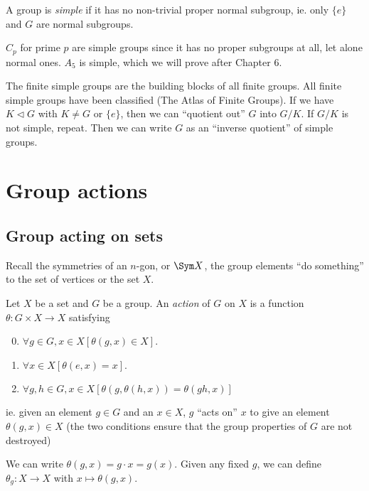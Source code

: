\documentclass[a4paper]{article}
\begin{document}
  \begin{defi}
    A group is \emph{simple} if it has no non-trivial proper normal subgroup, ie. only $\{e\}$ and $G$ are normal subgroups.
  \end{defi}

  \begin{eg}
    $C_p$ for prime $p$ are simple groups since it has no proper subgroups at all, let alone normal ones.
    $A_5$ is simple, which we will prove after Chapter 6.
  \end{eg}

  The finite simple groups are the building blocks of all finite groups. All finite simple groups have been classified (The Atlas of Finite Groups). If we have $K\lhd G$ with $K\not= G$ or $\{e\}$, then we can ``quotient out'' $G$ into $G/K$. If $G/K$ is not simple, repeat. Then we can write $G$ as an ``inverse quotient'' of simple groups.

  \section{Group actions}
  \subsection{Group acting on sets}
  Recall the symmetries of an $n$-gon, or $\Sym X$, the group elements ``do something'' to the set of vertices or the set $X$.

  \begin{defi}
    Let $X$ be a set and $G$ be a group. An \emph{action} of $G$ on $X$ is a function $\theta: G\times X\to X$ satisfying
    \begin{enumerate}[label=\arabic{*}.]
        \setcounter{enumi}{-1}
      \item $\forall g\in G, x\in X[\theta(g, x)\in X]$.
      \item $\forall x\in X[\theta(e, x) = x]$.
      \item $\forall g, h\in G, x\in X[\theta(g, \theta (h, x)) = \theta(gh, x)]$
    \end{enumerate}
    ie. given an element $g\in G$ and an $x\in X$, $g$ ``acts on'' $x$ to give an element $\theta(g, x)\in X$ (the two conditions ensure that the group properties of $G$ are not destroyed)
  \end{defi}

  \begin{notation}
    We can write $\theta(g, x) = g\cdot x = g(x)$. Given any fixed $g$, we can define $\theta_g: X\to X$ with $x\mapsto \theta(g, x)$.
  \end{notation}
\end{document}
